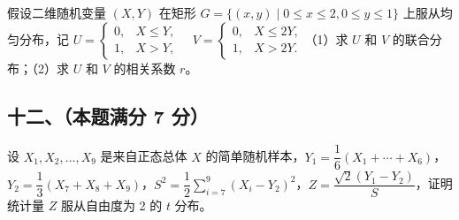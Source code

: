 \documentclass[UTF8,12pt]{ctexart}
\begin{document}
假设二维随机变量 \(\displaystyle (X,\allowbreak Y)\) 在矩形 \(\displaystyle G=\{(x,\allowbreak y)\mid 0\le x\le2,\allowbreak 0\le y\le1\}\) 上服从均匀分布，记 \(\displaystyle U=\begin{cases}0,\allowbreak &X\le Y,\allowbreak \\1,\allowbreak &X>Y,\allowbreak \end{cases}\quad V=\begin{cases}0,\allowbreak &X\le2Y,\allowbreak \\1,\allowbreak &X>2Y.\end{cases}\)（1）求 \(\displaystyle U\) 和 \(\displaystyle V\) 的联合分布；（2）求 \(\displaystyle U\) 和 \(\displaystyle V\) 的相关系数 \(\displaystyle r\)。


\subsection*{十二、（本题满分 7 分）}

设 \(\displaystyle X_1,\allowbreak X_2,\allowbreak \ldots,\allowbreak X_9\) 是来自正态总体 \(\displaystyle X\) 的简单随机样本，\(\displaystyle Y_1=\dfrac{\displaystyle 1}{\displaystyle 6}(X_1+\cdots+X_6)\)，\(\displaystyle Y_2=\dfrac{\displaystyle 1}{\displaystyle 3}(X_7+X_8+X_9)\)，\(\displaystyle S^2=\dfrac{\displaystyle 1}{\displaystyle 2}\displaystyle \sum_{i=7}^{9}(X_i-Y_2)^2\)，\(\displaystyle Z=\dfrac{\displaystyle \sqrt2(Y_1-Y_2)}{\displaystyle S}\)，证明统计量 \(\displaystyle Z\) 服从自由度为 2 的 \(\displaystyle t\) 分布。
\end{document}
